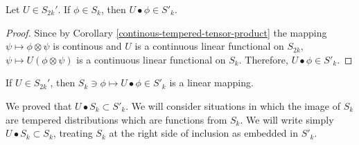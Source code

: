 \documentclass[main.tex]{subfiles}
\begin{document}
\begin{theorem}
Let $U\in S_{2k}'$. If $\phi\in S_k$, then $U\bullet \phi \in S'_k$.
\end{theorem}
\begin{proof}
Since by Corollary \ref{continous-tempered-tensor-product} the mapping $\psi \mapsto \phi \otimes \psi$ is continous and $U$ is a continuous linear functional on $S_{2k}$, $\psi \mapsto U(\phi\otimes\psi)$ is a continuous linear functional on $S_k$. Therefore, $U\bullet \phi \in S'_k$.
\end{proof}
\begin{corollary}
If $U\in S_{2k}'$, then $S_k\ni\phi\mapsto U\bullet\phi\in S'_k$ is a linear mapping.
\end{corollary}
We proved that $U\bullet S_k \subset S'_k$. We will consider situations in which the image of $S_k$ are tempered distributions which are functions from $S_k$. We will write simply $U\bullet S_k\subset S_k$, treating $S_k$ at the right side of inclusion as embedded in $S'_k$.
\end{document}
